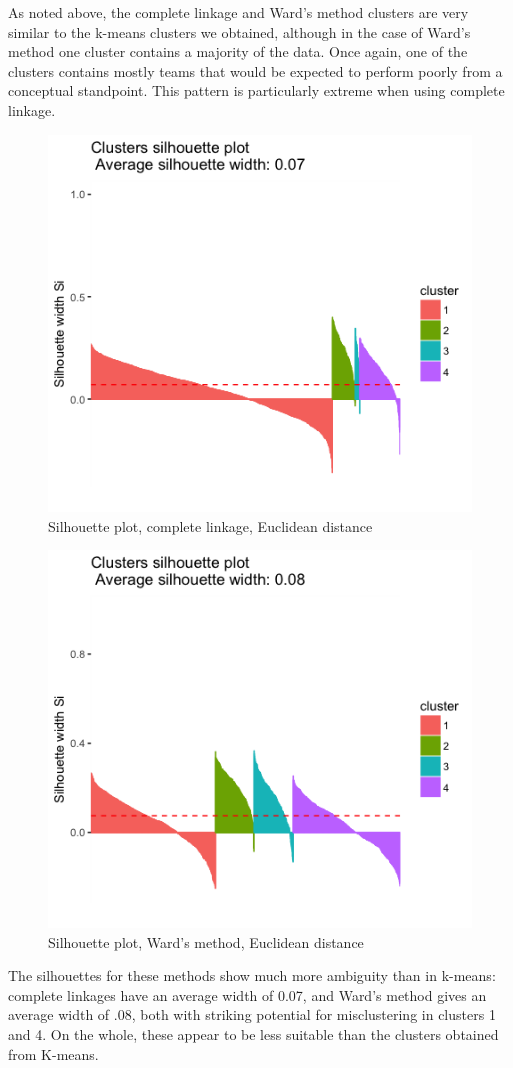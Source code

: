 \documentclass[10pt,a4paper, hidelinks]{article} %
\begin{document}
As noted above, the complete linkage and Ward's method clusters are very similar to the k-means clusters we obtained, although in the case of Ward's method one cluster contains a majority of the data. Once again, one of the clusters contains mostly teams that would be expected to perform poorly from a conceptual standpoint. This pattern is particularly extreme when using complete linkage.

\begin{figure}[H]
	\centering
	\includegraphics[width=0.7\linewidth]{"../fig/compsil"}
		\caption{Silhouette plot, complete linkage, Euclidean distance}
\end{figure}

\begin{figure}[H]
	\centering
	\includegraphics[width=0.7\linewidth]{"../fig/wardsil"}
		\caption{Silhouette plot, Ward's method, Euclidean distance}
\end{figure}

The silhouettes for these methods show much more ambiguity than in k-means: complete linkages have an average width of 0.07, and Ward's method gives an average width of .08, both with striking potential for misclustering in clusters 1 and 4.  On the whole, these appear to be less suitable than the clusters obtained from K-means.
\end{document}
